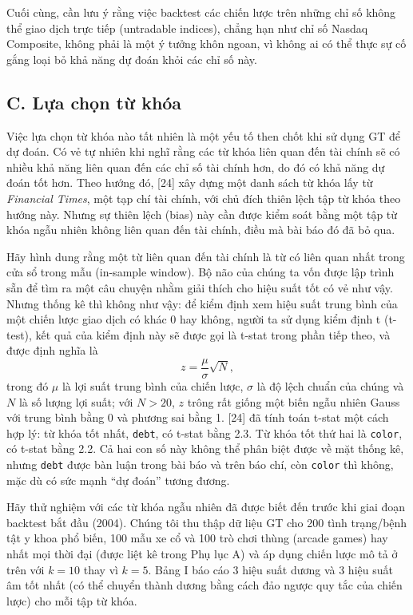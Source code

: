 Cuối cùng, cần lưu ý rằng việc backtest các chiến lược trên những chỉ số không thể giao dịch trực tiếp (untradable indices), chẳng hạn như chỉ số Nasdaq Composite, không phải là một ý tưởng khôn ngoan, vì không ai có thể thực sự cố gắng loại bỏ khả năng dự đoán khỏi các chỉ số này.

\subsection*{C. Lựa chọn từ khóa}

Việc lựa chọn từ khóa nào tất nhiên là một yếu tố then chốt khi sử dụng GT để dự đoán. Có vẻ tự nhiên khi nghĩ rằng các từ khóa liên quan đến tài chính sẽ có nhiều khả năng liên quan đến các chỉ số tài chính hơn, do đó có khả năng dự đoán tốt hơn. Theo hướng đó, [24] xây dựng một danh sách từ khóa lấy từ \emph{Financial Times}, một tạp chí tài chính, với chủ đích thiên lệch tập từ khóa theo hướng này. Nhưng sự thiên lệch (bias) này cần được kiểm soát bằng một tập từ khóa ngẫu nhiên không liên quan đến tài chính, điều mà bài báo đó đã bỏ qua.

Hãy hình dung rằng một từ liên quan đến tài chính là từ có liên quan nhất trong cửa sổ trong mẫu (in-sample window). Bộ não của chúng ta vốn được lập trình sẵn để tìm ra một câu chuyện nhằm giải thích cho hiệu suất tốt có vẻ như vậy. Nhưng thống kê thì không như vậy: để kiểm định xem hiệu suất trung bình của một chiến lược giao dịch có khác 0 hay không, người ta sử dụng kiểm định t (t-test), kết quả của kiểm định này sẽ được gọi là t-stat trong phần tiếp theo, và được định nghĩa là
$$
z = \frac{\mu}{\sigma}\sqrt{N},
$$
trong đó $\mu$ là lợi suất trung bình của chiến lược, $\sigma$ là độ lệch chuẩn của chúng và $N$ là số lượng lợi suất; với $N>20$, $z$ trông rất giống một biến ngẫu nhiên Gauss với trung bình bằng 0 và phương sai bằng 1. [24] đã tính toán t-stat một cách hợp lý: từ khóa tốt nhất, \texttt{debt}, có t-stat bằng 2.3. Từ khóa tốt thứ hai là \texttt{color}, có t-stat bằng 2.2. Cả hai con số này không thể phân biệt được về mặt thống kê, nhưng \texttt{debt} được bàn luận trong bài báo và trên báo chí, còn \texttt{color} thì không, mặc dù có sức mạnh ``dự đoán'' tương đương.

Hãy thử nghiệm với các từ khóa ngẫu nhiên đã được biết đến trước khi giai đoạn backtest bắt đầu (2004). Chúng tôi thu thập dữ liệu GT cho 200 tình trạng/bệnh tật y khoa phổ biến, 100 mẫu xe cổ và 100 trò chơi thùng (arcade games) hay nhất mọi thời đại (được liệt kê trong Phụ lục A) và áp dụng chiến lược mô tả ở trên với $k=10$ thay vì $k=5$. Bảng I báo cáo 3 hiệu suất dương và 3 hiệu suất âm tốt nhất (có thể chuyển thành dương bằng cách đảo ngược quy tắc của chiến lược) cho mỗi tập từ khóa.

